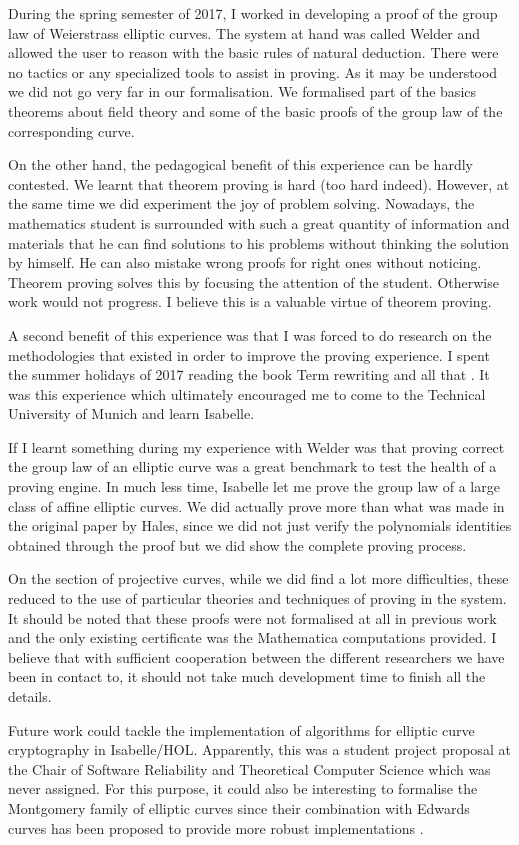 During the spring semester of 2017, I worked in developing a proof of the group law of Weierstrass elliptic curves. The system at hand was called Welder and allowed the user to reason with the basic rules of natural deduction. There were no tactics or any specialized tools to assist in proving. As it may be understood we did not go very far in our formalisation. We formalised part of the basics theorems about field theory and some of the basic proofs of the group law of the corresponding curve.

On the other hand, the pedagogical benefit of this experience can be hardly contested. We learnt that theorem proving is hard (too hard indeed). However, at the same time we did experiment the joy of problem solving. Nowadays, the mathematics student is surrounded with such a great quantity of information and materials that he can find solutions to his problems without thinking the solution by himself. He can also mistake wrong proofs for right ones without noticing. Theorem proving solves this by focusing the attention of the student. Otherwise work would not progress. I believe this is a valuable virtue of theorem proving.

A second benefit of this experience was that I was forced to do research on the methodologies that existed in order to improve the proving experience. I spent the summer holidays of 2017 reading the book Term rewriting and all that \cite{baader1999term}. It was this experience which ultimately encouraged me to come to the Technical University of Munich and learn Isabelle. 

If I learnt something during my experience with Welder was that proving correct the group law of an elliptic curve was a great benchmark to test the health of a proving engine. In much less time, Isabelle let me prove the group law of a large class of affine elliptic curves. We did actually prove more than what was made in the original paper by Hales, since we did not just verify the polynomials identities obtained through the proof but we did show the complete proving process. 

On the section of projective curves, while we did find a lot more difficulties, these reduced to the use of particular theories and techniques of proving in the system. It should be noted that these proofs were not formalised at all in previous work and the only existing certificate was the Mathematica computations provided. I believe that with sufficient cooperation between the different researchers we have been in contact to, it should not take much development time to finish all the details. 

Future work could tackle the implementation of algorithms for elliptic curve cryptography in Isabelle/HOL. Apparently, this was a student project proposal at the Chair of Software Reliability and Theoretical Computer Science which was never assigned. For this purpose, it could also be interesting to formalise the Montgomery family of elliptic curves since their combination with Edwards curves has been proposed to provide more robust implementations  \cite{costello2018montgomery}.








